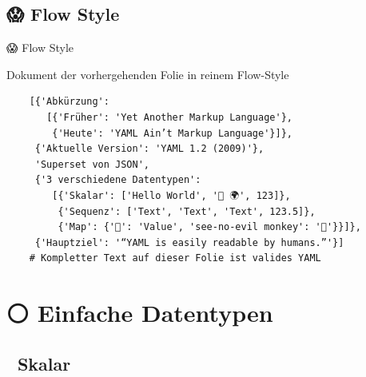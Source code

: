 \documentclass{beamer}
\begin{document}
\subsection{😱 Flow Style}

\begin{frame}[fragile]{😱 Flow Style}
  \begin{block}{Dokument der vorhergehenden Folie in reinem Flow-Style}
    \begin{verbatim}
    [{'Abkürzung':
       [{'Früher': 'Yet Another Markup Language'},
        {'Heute': 'YAML Ain’t Markup Language'}]},
     {'Aktuelle Version': 'YAML 1.2 (2009)'},
     'Superset von JSON',
     {'3 verschiedene Datentypen':
        [{'Skalar': ['Hello World', '👋 🌍', 123]},
         {'Sequenz': ['Text', 'Text', 'Text', 123.5]},
         {'Map': {'🔑': 'Value', 'see-no-evil monkey': '🙈'}}]},
     {'Hauptziel': '“YAML is easily readable by humans.”'}]
    # Kompletter Text auf dieser Folie ist valides YAML
    \end{verbatim}
  \end{block}
\end{frame}

\section{⚪️ Einfache Datentypen}

\subsection{📏  Skalar}
\end{document}
